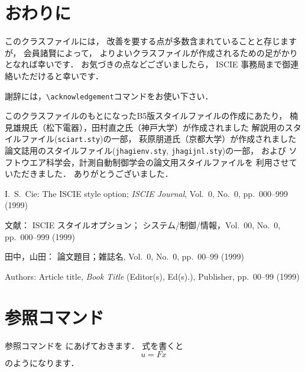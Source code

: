 \documentclass[J]{scitrans}
\begin{document}
\section{おわりに}

このクラスファイルには，
改善を要する点が多数含まれていることと存じますが，
会員諸賢によって，
よりよいクラスファイルが作成されるための足がかりとなれば幸いです．
お気づきの点などございましたら，
ISCIE 事務局まで御連絡いただけると幸いです．

\acknowledgement

謝辞には，\verb+\acknowledgement+コマンドをお使い下さい．

このクラスファイルのもとになったB5版スタイルファイルの作成にあたり，
楠見雄規氏（松下電器），田村直之氏（神戸大学）が作成されました
解説用のスタイルファイル({\tt sciart.sty})の一部，
萩原朋道氏（京都大学）が作成されました
論文誌用のスタイルファイル({\tt jhagienv.sty}, {\tt jhagijnl.sty})の一部，
および
ソフトウエア科学会，計測自動制御学会の論文用スタイルファイルを
利用させていただきました．
ありがとうございました．

\begin{thebibliography}{9}
        I.\ S.\ Cie:
        The ISCIE style option;
        {\it ISCIE Journal}, Vol.~0, No.~0, pp.~000--999 (1999)

        文献：
        ISCIE スタイルオプション；
        システム/制御/情報，Vol.~00, No.~0, pp.~000--999 (1999)

        田中，山田：
        論文題目；雑誌名, Vol.~0, No.~0, pp.~00--99 (1999)

        Authors:
        Article title, {\it Book Title} (Editor(s), Ed(s).), Publisher,
        pp.~00--99 (1999)
\end{thebibliography}

%
\appendix

\section{参照コマンド}     %
\label{sec:app}

参照コマンドを {} にあげておきます．
式を書くと
%
\begin{equation}
        u = F x
        \label{eq:app1}
\end{equation}
%
のようになります．
\end{document}
